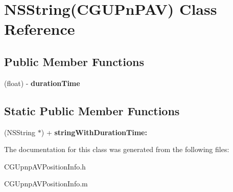 \hypertarget{interface_n_s_string_07_c_g_u_pn_p_a_v_08}{\section{N\-S\-String(C\-G\-U\-Pn\-P\-A\-V) Class Reference}
\label{interface_n_s_string_07_c_g_u_pn_p_a_v_08}
}
\subsection*{Public Member Functions}
\begin{DoxyCompactItemize}
\item 
\hypertarget{interface_n_s_string_07_c_g_u_pn_p_a_v_08_a655fd240a0b716fa000471ede02ba083}{(float) -\/ {\bfseries duration\-Time}}\label{interface_n_s_string_07_c_g_u_pn_p_a_v_08_a655fd240a0b716fa000471ede02ba083}

\end{DoxyCompactItemize}
\subsection*{Static Public Member Functions}
\begin{DoxyCompactItemize}
\item 
\hypertarget{interface_n_s_string_07_c_g_u_pn_p_a_v_08_a29b44ee679f62b5f0d84c7c9082273ad}{(N\-S\-String $\ast$) + {\bfseries string\-With\-Duration\-Time\-:}}\label{interface_n_s_string_07_c_g_u_pn_p_a_v_08_a29b44ee679f62b5f0d84c7c9082273ad}

\end{DoxyCompactItemize}


The documentation for this class was generated from the following files\-:\begin{DoxyCompactItemize}
\item 
C\-G\-Upnp\-A\-V\-Position\-Info.\-h\item 
C\-G\-Upnp\-A\-V\-Position\-Info.\-m\end{DoxyCompactItemize}

